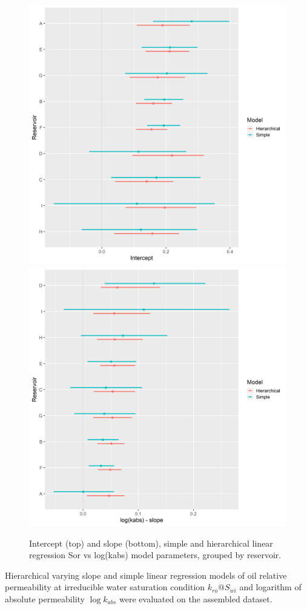 \documentclass[english,msc,numbers]{coppe}
\begin{document}
  \begin{figure}
  
  {\centering \includegraphics[width=0.75\linewidth]{figure/4-11-sor-intercept} \includegraphics[width=0.75\linewidth]{figure/4-11-sor-slopes} 
  
  }
  
  \caption{Intercept (top) and slope (bottom), simple and hierarchical linear regression Sor vs log(kabs) model  parameters, grouped by reservoir.}\label{fig:sor-simple-hierarchical-coefs}
  \end{figure}
  \par
  
  Hierarchical varying slope and simple linear regression models of oil relative permeability at irreducible water saturation condition \(k_{ro}@S_{wi}\) and logarithm of absolute permeability \(\log{k_{abs}}\) were evaluated on the assembled dataset.
  
\end{document}
